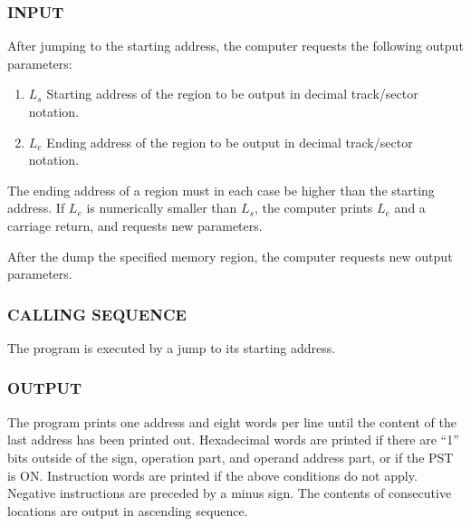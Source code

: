 \subsubsection*{INPUT}
After jumping to the starting address, the computer requests the following output parameters:
\begin{enumerate}
    \item $L_s$ Starting address of the region to be output in decimal track/sector notation.
    \item $L_e$ Ending address of the region to be output in decimal track/sector notation.
\end{enumerate}
The ending address of a region must in each case be higher than the starting address. If $L_e$ is numerically smaller than $L_s$, the computer prints $L_e$ and a carriage return, and requests new parameters.

After the dump the specified memory region, the computer requests new output parameters.

\subsubsection*{CALLING SEQUENCE}
The program is executed by a jump to its starting address.

\subsubsection*{OUTPUT}
The program prints one address and eight words per line until the content of the last address has been printed out. Hexadecimal words are printed if there are ``1'' bits outside of the sign, operation part, and operand address part, or if the \textsf{PST} is \textsf{ON}. Instruction words are printed if the above conditions do not apply. Negative instructions are preceded by a minus sign. The contents of consecutive locations are output in ascending sequence.

